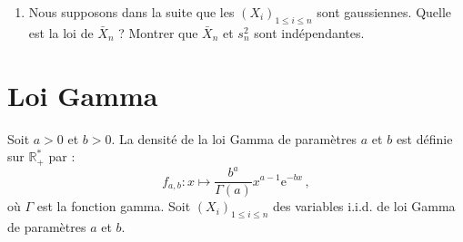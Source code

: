 \documentclass[a4paper,10pt,fleqn]{article}
\newcommand{\1}{\ensuremath{\mathbbm{1}}}
\begin{document}
\begin{enumerate}
\item  Nous supposons dans la suite que les $(X_i)_{1\leq i\leq n}$ sont gaussiennes. Quelle est la loi de $\bar X_n$ ? Montrer que $\bar X_n$ et $s_n^2$ sont ind\'ependantes.

%
%

%
%
%
%
%
%
%
%
\end{enumerate}

\section*{Loi Gamma}
Soit $a>0$ et $b>0$. La densit\'e de la loi Gamma de param\`etres $a$ et $b$ est d\'efinie sur $\mathbb{R}_+^*$ par :
$$
f_{a,b}: x\mapsto \frac{b^a}{\Gamma(a)}x^{a-1}\mathrm{e}^{-b x}\,,
$$
o\`u $\Gamma$ est la fonction gamma. Soit $(X_i)_{1\leq i \leq n}$ des variables i.i.d. de loi Gamma de param\`etres $a$ et $b$.
\end{document}
